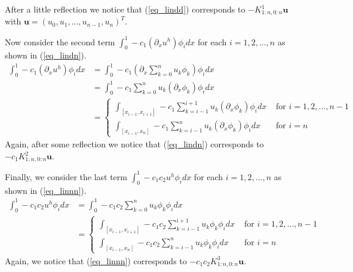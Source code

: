\documentclass[11pt,fleqn]{article}
\theoremstyle{defstyle}
\begin{document}
After a little reflection we notice that (\ref{eq_lindd}) corresponds to $-K^1_{1:n, 0:n}\mathbf{u}$ with $\mathbf{u} = \left(u_0, u_1,...,u_{n-1}, u_n \right)^T$. 

Now consider the second term $\int_0^1  -c_1(\partial_xu^h)\phi_idx$  for each $i=1,2,...,n$ as shown in (\ref{eq_lindn}).
\begin{equation}
\begin{aligned}
\int_0^1 -c_1(\partial_xu^h)\phi_idx &= \int_0^1 - c_1(\partial_x \sum_{k=0}^{n} u_k\phi_k)\phi_i dx \\
&= \int_0^1 -c_1\sum_{k=0}^{n} u_k(\partial_x\phi_k)\phi_idx \\
&= \begin{cases}
\int_{[x_{i-1},x_{i+1}]}-c_1\sum_{k=i-1}^{i+1} u_k(\partial_x\phi_k)\phi_idx &\text{ for } i=1,2,..., n-1 \\
\int_{[x_{i-1},x_{n}]}-c_1\sum_{k=i-1}^{n} u_k(\partial_x\phi_k)\phi_idx &\text{ for } i=n
\end{cases}
\end{aligned}
\label{eq_lindn}
\end{equation}
Again, after some reflection we notice that (\ref{eq_lindn}) corresponds to $-c_1K^2_{1:n, 0:n}\mathbf{u}$. 

Finally, we consider the last term $\int_0^1 - c_1c_2u^h\phi_idx$ for each $i=1,2,...,n$ as shown in (\ref{eq_linnn}).
\begin{equation}
\begin{aligned}
\int_0^1 -c_1c_2u^h\phi_idx &= \int_0^1 - c_1c_2\sum_{k=0}^{n} u_k\phi_k\phi_i dx \\
&= \begin{cases}
\int_{[x_{i-1},x_{i+1}]}-c_1c_2\sum_{k=i-1}^{i+1} u_k\phi_k\phi_idx &\text{ for } i=1,2,..., n-1 \\
\int_{[x_{i-1},x_{n}]}-c_1c_2\sum_{k=i-1}^{n} u_k\phi_k\phi_idx &\text{ for } i=n
\end{cases}
\end{aligned}
\label{eq_linnn}
\end{equation}
Again, we notice that (\ref{eq_linnn}) corresponds to $-c_1c_2K^3_{1:n, 0:n}\mathbf{u}$.
\end{document}
